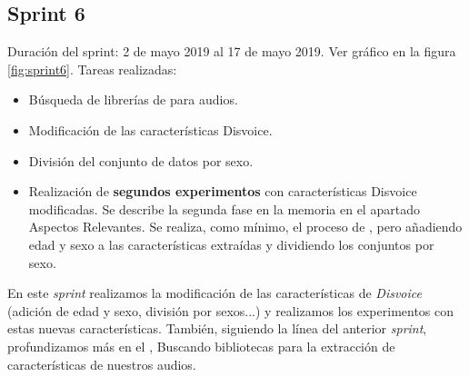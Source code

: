 \subsection{Sprint 6}
Duración del sprint: 2 de mayo 2019 al 17 de mayo 2019. Ver gráfico  en la figura \ref{fig:sprint6}.
Tareas realizadas:
\begin{itemize}
\item Búsqueda de librerías de  para audios.
\item Modificación de las características Disvoice.
\item División del conjunto de datos por sexo.
\item Realización de \textbf{segundos experimentos} con características Disvoice modificadas. Se describe la segunda fase en la memoria en el apartado Aspectos Relevantes. Se realiza, como mínimo, el proceso de \cite{Orz2016}, pero añadiendo edad y sexo a las características extraídas y dividiendo los conjuntos por sexo.
\end{itemize}
En este \textit{sprint} realizamos la modificación de las características de \textit{Disvoice} (adición de edad y sexo, división por sexos...) y realizamos los experimentos con estas nuevas características. También, siguiendo la línea del anterior \textit{sprint}, profundizamos más en el , Buscando bibliotecas para la extracción de características de nuestros audios.

